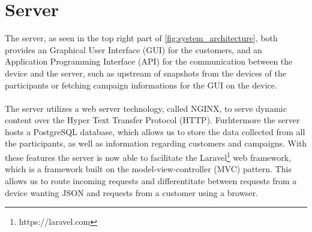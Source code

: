 \section{Server}
\label{sec:server}
The server, as seen in the top right part of \ref{fig:system_architecture}, both provides an Graphical User Interface (GUI) for the customers, and an Application Programming Interface (API) for the communication between the device and the server, such as upstream of snapshots from the devices of the participants or fetching campaign informations for the GUI on the device. 
\\\\
The server utilizes a web server technology, called NGINX, to serve dynamic content over the Hyper Text Transfer Protocol (HTTP). Furhtermore the server hosts a PostgreSQL database, which allows us to store the data collected from all the participants, as well as information regarding customers and campaigns.  
With these features the server is now able to facilitate the Laravel\footnote{https://laravel.com} web framework, which is a framework built on the model-view-controller (MVC) pattern. This allows us to route incoming requests and differentitate between requests from a device wanting JSON and requests from a customer using a browser. 







